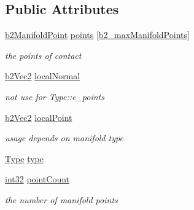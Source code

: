 \subsection*{Public Attributes}
\begin{DoxyCompactItemize}
\item 
\mbox{\hyperlink{structb2_manifold_point}{b2\+Manifold\+Point}} \mbox{\hyperlink{structb2_manifold_ab8021128e9792cc7391a8804ea02173d}{points}} \mbox{[}\mbox{\hyperlink{b2_settings_8h_aa5f44cc9edf711433dea2b2ec94f3c42}{b2\+\_\+max\+Manifold\+Points}}\mbox{]}
\begin{DoxyCompactList}\small\item\em the points of contact \end{DoxyCompactList}\item 
\mbox{\hyperlink{structb2_vec2}{b2\+Vec2}} \mbox{\hyperlink{structb2_manifold_a3604e9fef2a03347c5649c71a9fd4c79}{local\+Normal}}
\begin{DoxyCompactList}\small\item\em not use for Type\+::e\+\_\+points \end{DoxyCompactList}\item 
\mbox{\hyperlink{structb2_vec2}{b2\+Vec2}} \mbox{\hyperlink{structb2_manifold_a8825cea31b27dbbaf22c13c3070870d5}{local\+Point}}
\begin{DoxyCompactList}\small\item\em usage depends on manifold type \end{DoxyCompactList}\item 
\mbox{\hyperlink{structb2_manifold_aa9c347e2ff2e27ee820a926efbb33e12}{Type}} \mbox{\hyperlink{structb2_manifold_a4cb6ceba7105513b1e5bd6dbf0cce168}{type}}
\item 
\mbox{\hyperlink{b2_settings_8h_a43d43196463bde49cb067f5c20ab8481}{int32}} \mbox{\hyperlink{structb2_manifold_abf59ff6fa36bed34b0242ad54951a696}{point\+Count}}
\begin{DoxyCompactList}\small\item\em the number of manifold points \end{DoxyCompactList}\end{DoxyCompactItemize}


